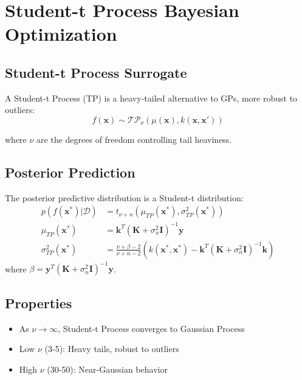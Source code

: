 \documentclass[11pt,a4paper]{article}
\begin{document}
\section{Student-t Process Bayesian Optimization}

\subsection{Student-t Process Surrogate}

A Student-t Process (TP) is a heavy-tailed alternative to GPs, more robust to outliers:
\begin{equation}
    f(\mathbf{x}) \sim \mathcal{TP}_\nu(\mu(\mathbf{x}), k(\mathbf{x}, \mathbf{x}'))
\end{equation}

where $\nu$ are the degrees of freedom controlling tail heaviness.

\subsection{Posterior Prediction}

The posterior predictive distribution is a Student-t distribution:
\begin{align}
    p(f(\mathbf{x}^*) | \mathcal{D}) &= t_{\nu+n}(\mu_{TP}(\mathbf{x}^*), \sigma^2_{TP}(\mathbf{x}^*)) \\
    \mu_{TP}(\mathbf{x}^*) &= \mathbf{k}^T (\mathbf{K} + \sigma_n^2 \mathbf{I})^{-1} \mathbf{y} \\
    \sigma^2_{TP}(\mathbf{x}^*) &= \frac{\nu + \beta - 2}{\nu + n - 2} \left(k(\mathbf{x}^*, \mathbf{x}^*) - \mathbf{k}^T (\mathbf{K} + \sigma_n^2 \mathbf{I})^{-1} \mathbf{k}\right)
\end{align}
where $\beta = \mathbf{y}^T(\mathbf{K} + \sigma_n^2 \mathbf{I})^{-1}\mathbf{y}$.

\subsection{Properties}

\begin{itemize}
    \item As $\nu \rightarrow \infty$, Student-t Process converges to Gaussian Process
    \item Low $\nu$ (3-5): Heavy tails, robust to outliers
    \item High $\nu$ (30-50): Near-Gaussian behavior
\end{itemize}
\end{document}
